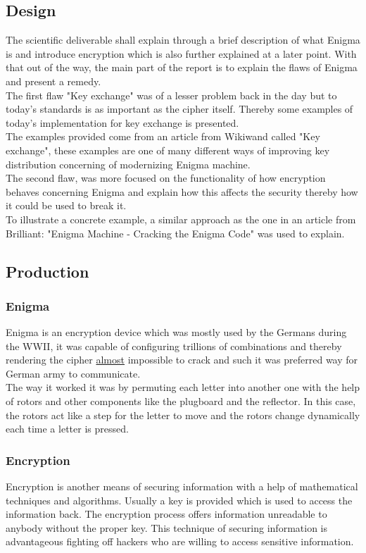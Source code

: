 \documentclass[conference,compsoc]{IEEEtran}
\begin{document}
\subsection{Design}
The scientific deliverable shall explain through a brief description of what Enigma is and introduce encryption which is also further explained at a later point. With that out of the way, the main part of the report is to explain the flaws of Enigma and present a remedy.\\

The first flaw "Key exchange" was of a lesser problem back in the day but to today's standards is as important as the cipher itself. Thereby some examples of today's implementation for key exchange is presented.\\
The examples provided come from an article from Wikiwand called "Key exchange", these examples are one of many different ways of improving key distribution concerning of modernizing Enigma machine.\\ 

The second flaw, was more focused on the functionality of how encryption behaves concerning Enigma and explain how this affects the security thereby how it could be used to break it.\\
To illustrate a concrete example, a similar approach as the one in an article from Brilliant: "Enigma Machine - Cracking the Enigma Code" was used to explain.\\

\subsection{Production}

\subsubsection{Enigma} Enigma is an encryption device which was mostly used by the Germans during the WWII, it was capable of configuring trillions of combinations and thereby rendering the cipher \underline{almost} impossible to crack and such it was preferred way for German army to communicate.\\
The way it worked it was by permuting each letter into another one with the help of rotors and other components like the plugboard and the reflector. In this case, the rotors act like a step for the letter to move and the rotors change dynamically each time a letter is pressed.

\subsubsection{Encryption} Encryption is another means of securing information with a help of mathematical techniques and algorithms. Usually a key is provided which is used to access the information back. The encryption process offers information unreadable to anybody without the proper key. This technique of securing information is advantageous fighting off hackers who are willing to access sensitive information.
\end{document}
